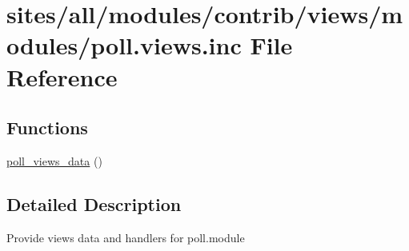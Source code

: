 \hypertarget{poll_8views_8inc}{
\section{sites/all/modules/contrib/views/modules/poll.views.inc File Reference}
\label{poll_8views_8inc}
}
\subsection*{Functions}
\begin{CompactItemize}
\item 
\hyperlink{group__views__poll__module_g02ad941a7e05ae1fe142ac35ad3ccb19}{poll\_\-views\_\-data} ()
\end{CompactItemize}


\subsection{Detailed Description}
Provide views data and handlers for poll.module 